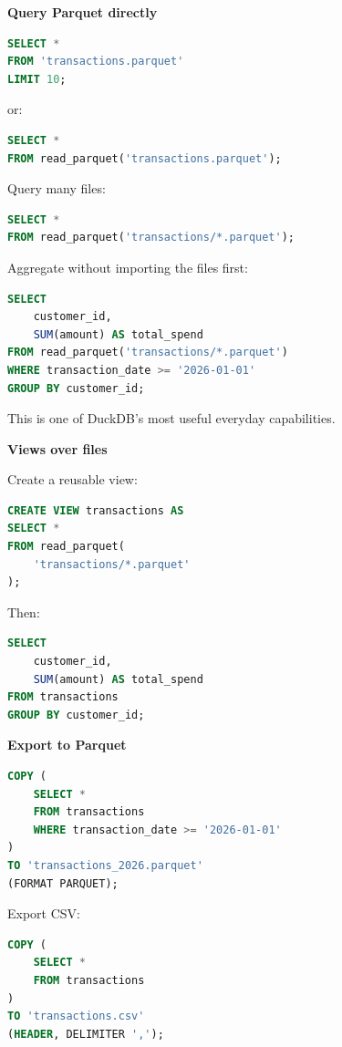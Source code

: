 \documentclass[11pt,letterpaper]{article}
\begin{document}
\textbf{Query Parquet directly}

\begin{lstlisting}[language=SQL]
SELECT *
FROM 'transactions.parquet'
LIMIT 10;
\end{lstlisting}

or:

\begin{lstlisting}[language=SQL]
SELECT *
FROM read_parquet('transactions.parquet');
\end{lstlisting}

Query many files:

\begin{lstlisting}[language=SQL]
SELECT *
FROM read_parquet('transactions/*.parquet');
\end{lstlisting}

Aggregate without importing the files first:

\begin{lstlisting}[language=SQL]
SELECT
    customer_id,
    SUM(amount) AS total_spend
FROM read_parquet('transactions/*.parquet')
WHERE transaction_date >= '2026-01-01'
GROUP BY customer_id;
\end{lstlisting}

This is one of DuckDB's most useful everyday capabilities.

\textbf{Views over files}

Create a reusable view:

\begin{lstlisting}[language=SQL]
CREATE VIEW transactions AS
SELECT *
FROM read_parquet(
    'transactions/*.parquet'
);
\end{lstlisting}

Then:

\begin{lstlisting}[language=SQL]
SELECT
    customer_id,
    SUM(amount) AS total_spend
FROM transactions
GROUP BY customer_id;
\end{lstlisting}

\textbf{Export to Parquet}

\begin{lstlisting}[language=SQL]
COPY (
    SELECT *
    FROM transactions
    WHERE transaction_date >= '2026-01-01'
)
TO 'transactions_2026.parquet'
(FORMAT PARQUET);
\end{lstlisting}

Export CSV:

\begin{lstlisting}[language=SQL]
COPY (
    SELECT *
    FROM transactions
)
TO 'transactions.csv'
(HEADER, DELIMITER ',');
\end{lstlisting}
\end{document}
